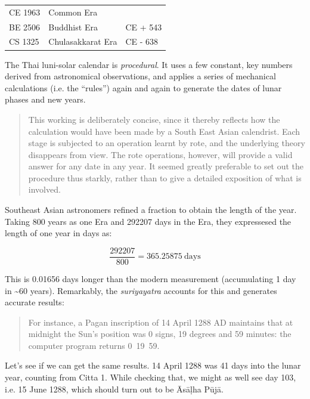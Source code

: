\documentclass[11pt,oneside]{memoir-article}
\begin{document}
\begin{center}
\begin{tabular}{lll}
CE 1963 & Common Era & \\
BE 2506 & Buddhist Era & CE + 543\\
CS 1325 & Chulasakkarat Era & CE - 638\\
\end{tabular}
\end{center}

The Thai luni-solar calendar is \emph{procedural}. It uses a few constant,
key numbers derived from astronomical observations, and applies a
series of mechanical calculations (i.e. the ``rules'') again and again
to generate the dates of lunar phases and new years.

\begin{quote}
This working is deliberately concise, since it thereby reflects how
the calculation would have been made by a South East Asian calendrist.
Each stage is subjected to an operation learnt by rote, and the
underlying theory disappears from view. The rote operations, however,
will provide a valid answer for any date in any year. It seemed
greatly preferable to set out the procedure thus starkly, rather than
to give a detailed exposition of what is involved.\autocite{eade-interpolation}
\end{quote}

Southeast Asian astronomers refined a fraction to obtain the length of the year.
Taking 800 years as one Era and 292207 days in the Era, they expressesed the
length of one year in days as:\autocite{eade-interpolation}

\begin{equation}
\frac{292207}{800} = 365.25875\ \text{days}
\end{equation}

This is 0.01656 days longer than the modern measurement (accumulating
1 day in \textasciitilde{}60 years). Remarkably, the \emph{suriyayatra} accounts for this
and generates accurate results:

\begin{quote}
For instance, a Pagan inscription of 14 April 1288 AD maintains that
at midnight the Sun's position was 0 signs, 19 degrees and 59 minutes:
the computer program returns
0~19~59.\autocite[p. 2]{eade1995calendrical}
\end{quote}

Let's see if we can get the same results. 14 April 1288 was 41 days into the
lunar year, counting from Citta 1. While checking that, we might as well see day
103, i.e. 15 June 1288, which should turn out to be Āsāḷha Pūjā.
\end{document}
